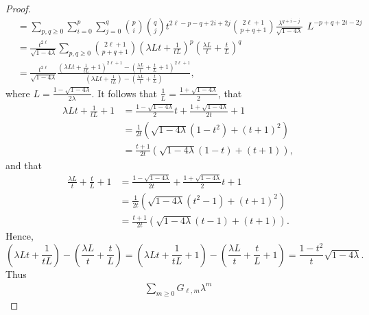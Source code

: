 \documentclass{amsart}
\numberwithin{equation}{section}
\theoremstyle{plain}
\theoremstyle{definition}
\begin{document}
\begin{proof}
\[\begin{aligned}
&=
\sum_{p,q \ge 0}
\sum_{i=0}^p \sum_{j=0}^q  
\binom{p}{i} \binom{q}{j}
t^{2\ell -p-q + 2i + 2j}
%
\binom{2 \ell +1}{p+q+1}
%
\frac{ \lambda^{q + i -j}}{\sqrt{1 - 4 \lambda}}
\ \ L^{-p +q + 2i -2j}
\\
&=
\frac{t^{2\ell}}{\sqrt{1 - 4 \lambda}}
\sum_{p,q \ge 0}
\binom{2 \ell +1}{p+q+1}
\left(
\lambda L t + \frac{1}{tL}
\right)^p
\left(
\frac{\lambda L}{t}+\frac{t}{L}
\right)^q
\\
&=
\frac{t^{2\ell}}{\sqrt{1 - 4 \lambda}}
\frac{
(\lambda L t +\frac{1}{tL}+1)^{2\ell+1}
-
(\frac{\lambda L}{t}+\frac{t}{L}+1)^{2\ell+1}
}
{
(\lambda L t + \frac{1}{tL})-(\frac{\lambda L}{t}+\frac{t}{L})
},
\end{aligned}
\]
where $L =\frac{1-\sqrt{1 - 4 \lambda}}{2 \lambda}$.
It follows that $\frac{1}{L} = \frac{1+\sqrt{1 - 4 \lambda}}{2}$, that
\[\begin{aligned}
    \lambda L t +\frac{1}{tL}+1 &=  \frac{1-\sqrt{1 - 4 \lambda}}{2} t
+\frac{1+\sqrt{1 - 4 \lambda}}{2t } +1\\
&=
\frac{1}{2t} 
\left(\sqrt{1 - 4 \lambda} (1-t^2) +(t+1)^2 \right)\\
&=
\frac{t+1}{2t} 
\left(\sqrt{1 - 4 \lambda} (1-t) +(t+1) \right),
\end{aligned}\]
and that
\[\begin{aligned}
\frac{\lambda L}{t}+\frac{t}{L}+1
&=\frac{1-\sqrt{1 - 4 \lambda}}{2t}
+\frac{1+\sqrt{1 - 4 \lambda}}{2} t +1\\
&=
\frac{1}{2t} 
\left(\sqrt{1 - 4 \lambda} (t^2-1) + (t+1)^2 \right)\\
&=
\frac{t+1}{2t} 
\left(\sqrt{1 - 4 \lambda} (t-1) +(t+1) \right).
\end{aligned}
\]
Hence,
\[
%
%
%
\left(\lambda L t +\frac{1}{tL}\right)-\left(\frac{\lambda L}{t}+\frac{t}{L}\right) = 
\left(\lambda L t +\frac{1}{tL}+1\right)-\left(\frac{\lambda L}{t}+\frac{t}{L}+1\right) =
\frac{1-t^2}{t}
\sqrt{1-4\lambda}.
\]
Thus
\[
\begin{aligned}
    \sum_{m \ge 0} G_{\ell, m} \lambda^m

\end{aligned}\]
\end{proof}
\end{document}
